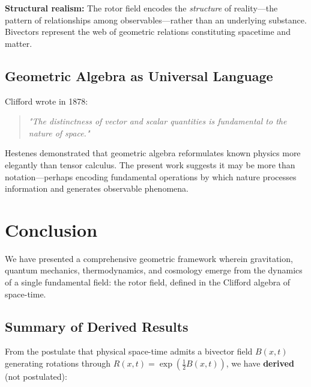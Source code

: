 \documentclass[11pt,a4paper]{article}
\numberwithin{equation}{section}
\theoremstyle{plain}
\theoremstyle{definition}
\theoremstyle{remark}
\begin{document}
\textbf{Structural realism:} The rotor field encodes the \emph{structure} of reality—the pattern of relationships among observables—rather than an underlying substance. Bivectors represent the web of geometric relations constituting spacetime and matter.

\subsection{Geometric Algebra as Universal Language}

Clifford wrote in 1878:

\begin{quote}
\textit{"The distinctness of vector and scalar quantities is fundamental to the nature of space."}
\end{quote}

Hestenes demonstrated that geometric algebra reformulates known physics more elegantly than tensor calculus. The present work suggests it may be more than notation—perhaps encoding fundamental operations by which nature processes information and generates observable phenomena.

\section{Conclusion}
\label{sec:conclusion}

We have presented a comprehensive geometric framework wherein gravitation, quantum mechanics, thermodynamics, and cosmology emerge from the dynamics of a single fundamental field: the rotor field, defined in the Clifford algebra of space-time.

\subsection{Summary of Derived Results}

From the postulate that physical space-time admits a bivector field $B(x,t)$ generating rotations through $R(x,t) = \exp(\frac{1}{2}B(x,t))$, we have \textbf{derived} (not postulated):
\end{document}
